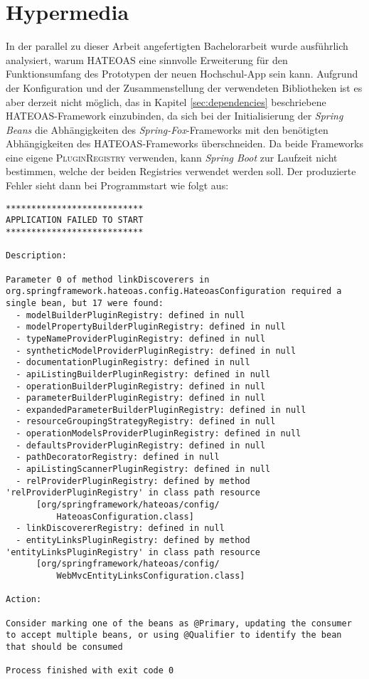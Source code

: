\section{Hypermedia}

In der parallel zu dieser Arbeit angefertigten Bachelorarbeit wurde ausführlich analysiert, warum \ac{HATEOAS} eine sinnvolle Erweiterung für den Funktionsumfang des Prototypen der neuen Hochschul-\ac{App} sein kann. Aufgrund der Konfiguration und der Zusammenstellung der verwendeten Bibliotheken ist es aber derzeit nicht möglich, das in Kapitel \ref{sec:dependencies} beschriebene \ac{HATEOAS}-Framework einzubinden, da sich bei der Initialisierung der \textit{Spring Beans} die Abhängigkeiten des \textit{Spring-Fox}-Frameworks mit den benötigten Abhängigkeiten des \ac{HATEOAS}-Frameworks überschneiden. Da beide Frameworks eine eigene \textsc{PluginRegistry} verwenden, kann \textit{Spring Boot} zur Laufzeit nicht bestimmen, welche der beiden Registries verwendet werden soll. Der produzierte Fehler sieht dann bei Programmstart wie folgt aus:

\newpage
\begin{lstlisting}[caption={PluginRegistry Bean Konflikt}]
***************************
APPLICATION FAILED TO START
***************************

Description:

Parameter 0 of method linkDiscoverers in org.springframework.hateoas.config.HateoasConfiguration required a single bean, but 17 were found:
  - modelBuilderPluginRegistry: defined in null
  - modelPropertyBuilderPluginRegistry: defined in null
  - typeNameProviderPluginRegistry: defined in null
  - syntheticModelProviderPluginRegistry: defined in null
  - documentationPluginRegistry: defined in null
  - apiListingBuilderPluginRegistry: defined in null
  - operationBuilderPluginRegistry: defined in null
  - parameterBuilderPluginRegistry: defined in null
  - expandedParameterBuilderPluginRegistry: defined in null
  - resourceGroupingStrategyRegistry: defined in null
  - operationModelsProviderPluginRegistry: defined in null
  - defaultsProviderPluginRegistry: defined in null
  - pathDecoratorRegistry: defined in null
  - apiListingScannerPluginRegistry: defined in null
  - relProviderPluginRegistry: defined by method 'relProviderPluginRegistry' in class path resource 
      [org/springframework/hateoas/config/
          HateoasConfiguration.class]
  - linkDiscovererRegistry: defined in null
  - entityLinksPluginRegistry: defined by method 'entityLinksPluginRegistry' in class path resource 
      [org/springframework/hateoas/config/
          WebMvcEntityLinksConfiguration.class]

Action:

Consider marking one of the beans as @Primary, updating the consumer to accept multiple beans, or using @Qualifier to identify the bean that should be consumed

Process finished with exit code 0
\end{lstlisting}

